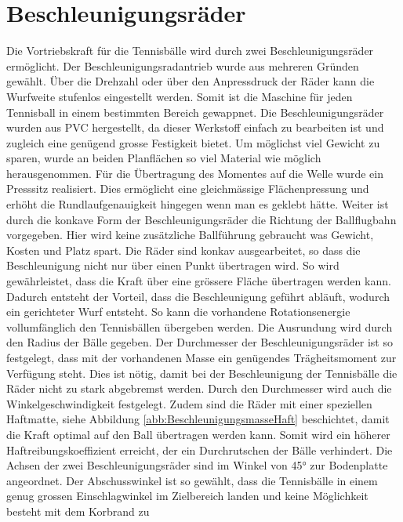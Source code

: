\section{Beschleunigungsräder}
    Die Vortriebskraft für die Tennisbälle wird durch zwei Beschleunigungsräder ermöglicht. Der 
    Beschleunigungsradantrieb wurde aus mehreren Gründen gewählt. Über die Drehzahl oder über den 
    Anpressdruck der Räder kann die Wurfweite stufenlos eingestellt werden. Somit ist die Maschine 
    für jeden Tennisball in einem bestimmten Bereich gewappnet. Die Beschleunigungsräder wurden 
    aus PVC hergestellt, da dieser Werkstoff einfach zu bearbeiten ist und zugleich eine genügend 
    grosse Festigkeit bietet. Um möglichst viel Gewicht zu sparen, wurde an beiden Planflächen so 
    viel Material wie möglich herausgenommen. Für die Übertragung des Momentes auf die Welle wurde 
    ein Presssitz realisiert. Dies ermöglicht eine gleichmässige Flächenpressung und erhöht die 
    Rundlaufgenauigkeit hingegen wenn man es geklebt hätte. Weiter ist durch die konkave Form der 
    Beschleunigungsräder die Richtung der Ballflugbahn vorgegeben. Hier wird keine zusätzliche Ballführung 
    gebraucht was Gewicht, Kosten und Platz spart. Die Räder sind konkav ausgearbeitet, so dass die Beschleunigung nicht nur über einen Punkt übertragen wird. So wird gewährleistet, dass die Kraft 
    über eine grössere Fläche übertragen werden kann. Dadurch entsteht der Vorteil, dass die 
    Beschleunigung geführt abläuft, wodurch ein gerichteter Wurf entsteht. So kann die vorhandene 
    Rotationsenergie vollumfänglich den Tennisbällen übergeben werden. Die Ausrundung wird durch 
    den Radius der Bälle gegeben. Der Durchmesser der Beschleunigungsräder ist so festgelegt, dass 
    mit der vorhandenen Masse ein genügendes Trägheitsmoment zur Verfügung steht. Dies ist nötig, 
    damit bei der Beschleunigung der Tennisbälle die Räder nicht zu stark abgebremst werden. Durch 
    den Durchmesser wird auch die Winkelgeschwindigkeit festgelegt. Zudem sind die Räder mit einer 
    speziellen Haftmatte, siehe Abbildung \ref{abb:BeschleunigungsmasseHaft} beschichtet, damit die 
    Kraft optimal auf den Ball übertragen werden kann. Somit wird ein höherer Haftreibungskoeffizient 
    erreicht, der ein Durchrutschen der Bälle verhindert. Die Achsen der zwei Beschleunigungsräder sind im 
    Winkel von 45\si{\degree} zur Bodenplatte angeordnet. Der Abschusswinkel ist so gewählt, dass 
    die Tennisbälle in einem genug grossen Einschlagwinkel im Zielbereich landen und keine Möglichkeit 
    besteht mit dem Korbrand zu 
